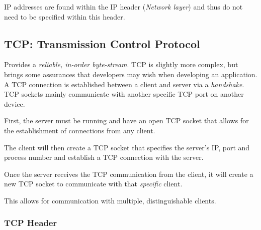 \documentclass{article}
\begin{document}
IP addresses are found within the IP header (\textit{Network layer}) and thus do not need to be specified within this header.

\subsection{TCP: Transmission Control Protocol}

Provides a \textit{reliable, in-order byte-stream}. TCP is slightly more complex, but brings some assurances that developers may wish when developing an application. A TCP connection is established between a client and server via a \textit{handshake}. TCP sockets mainly communicate with another specific TCP port on another device.

First, the server must be running and have an open TCP socket that allows for the establishment of connections from any client. 

The client will then create a TCP socket that specifies the server's IP, port and process number and establish a TCP connection with the server.

Once the server receives the TCP communication from the client, it will create a new TCP socket to communicate with that \textit{specific} client.

This allows for communication with multiple, distinguishable clients.
\filbreak
\subsubsection{TCP Header}
\end{document}
